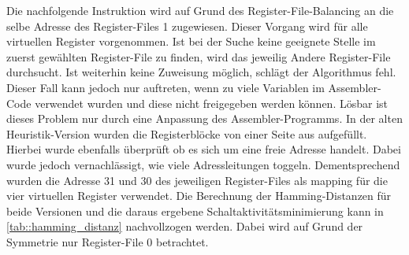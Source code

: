 Die nachfolgende Instruktion wird auf Grund des Register-File-Balancing an die selbe Adresse des Register-Files 1 zugewiesen. Dieser Vorgang wird für alle virtuellen Register vorgenommen. Ist bei der Suche keine geeignete Stelle im zuerst gewählten Register-File zu finden, wird das jeweilig Andere Register-File durchsucht. Ist weiterhin keine Zuweisung möglich, schlägt der Algorithmus fehl. Dieser Fall kann jedoch nur auftreten, wenn zu viele Variablen im Assembler-Code verwendet wurden und diese nicht freigegeben werden können. Lösbar ist dieses Problem nur durch eine Anpassung des Assembler-Programms.
In der alten Heuristik-Version wurden die Registerblöcke von einer Seite aus aufgefüllt. Hierbei wurde ebenfalls überprüft ob es sich um eine freie Adresse handelt. Dabei wurde jedoch vernachlässigt, wie viele Adressleitungen toggeln. Dementsprechend wurden die Adresse 31 und 30 des jeweiligen Register-Files als mapping für die vier virtuellen Register verwendet.
Die Berechnung der Hamming-Distanzen für beide Versionen und die daraus ergebene Schaltaktivitätsminimierung kann in \ref{tab::hamming_distanz} nachvollzogen werden. Dabei wird auf Grund der Symmetrie nur Register-File 0 betrachtet.
